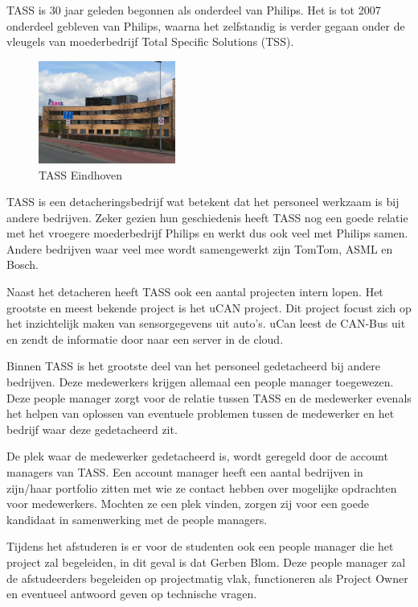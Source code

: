 \documentclass[]{article}
\begin{document}
TASS is 30 jaar geleden begonnen als onderdeel van Philips. Het is tot 2007
onderdeel gebleven van Philips, waarna het zelfstandig is verder gegaan
onder de vleugels van moederbedrijf Total Specific Solutions (TSS).

\begin{figure}
  \begin{center}
    \includegraphics[width=0.40\textwidth]{tass_eindhoven.pdf}
  \end{center}
  \caption{TASS Eindhoven}
\end{figure}

TASS is een detacheringsbedrijf wat betekent dat het personeel werkzaam is bij
andere bedrijven. Zeker gezien hun geschiedenis heeft TASS nog een goede
relatie met het vroegere moederbedrijf Philips en werkt dus ook veel met Philips
samen. Andere bedrijven waar veel mee wordt samengewerkt zijn TomTom, ASML
en Bosch.

Naast het detacheren heeft TASS ook een aantal projecten intern lopen. Het
grootste en meest bekende project is het uCAN project. Dit project
focust zich op het inzichtelijk maken van sensorgegevens uit auto's. uCan
leest de CAN-Bus uit en zendt de informatie door naar een server in de
cloud.

Binnen TASS is het grootste deel van het personeel gedetacheerd bij andere
bedrijven. Deze medewerkers krijgen allemaal een people manager toegewezen.
Deze people manager zorgt voor de relatie tussen TASS en de medewerker evenals
het helpen van oplossen van eventuele problemen tussen de medewerker en het bedrijf waar deze
gedetacheerd zit.

De plek waar de medewerker gedetacheerd is, wordt geregeld door de account
managers van TASS. Een account manager heeft een aantal bedrijven in
zijn/haar portfolio zitten met wie ze contact hebben over mogelijke
opdrachten voor medewerkers. Mochten ze een plek vinden, zorgen zij voor
een goede kandidaat in samenwerking met de people managers.

Tijdens het afstuderen is er voor de studenten ook een people manager
die het project zal begeleiden, in dit geval is dat Gerben Blom. Deze
people manager zal de afstudeerders begeleiden op projectmatig vlak,
functioneren als Project Owner en eventueel antwoord geven op technische
vragen.
\end{document}
